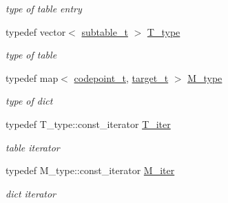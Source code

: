 \begin{DoxyCompactItemize}
\begin{DoxyCompactList}\small\item\em type of table entry \end{DoxyCompactList}\item 
\hypertarget{namespacejlettvin_a7791a7f100e442c5b74a901442cd3197}{}typedef vector$<$ \hyperlink{namespacejlettvin_a7133ba660d288e5f368d7285843739c8}{subtable\+\_\+t} $>$ \hyperlink{namespacejlettvin_a7791a7f100e442c5b74a901442cd3197}{T\+\_\+type}\label{namespacejlettvin_a7791a7f100e442c5b74a901442cd3197}

\begin{DoxyCompactList}\small\item\em type of table \end{DoxyCompactList}\item 
\hypertarget{namespacejlettvin_a37ff8ef881a4ed6efce44bac38621732}{}typedef map$<$ \hyperlink{namespacejlettvin_a5c480560edc7a71c9f5ae6dad14e6fec}{codepoint\+\_\+t}, \hyperlink{namespacejlettvin_ac925326f2732a65f4e3caaea182401a9}{target\+\_\+t} $>$ \hyperlink{namespacejlettvin_a37ff8ef881a4ed6efce44bac38621732}{M\+\_\+type}\label{namespacejlettvin_a37ff8ef881a4ed6efce44bac38621732}

\begin{DoxyCompactList}\small\item\em type of dict \end{DoxyCompactList}\item 
\hypertarget{namespacejlettvin_a717af5c4fa2045ec8271403a711500be}{}typedef T\+\_\+type\+::const\+\_\+iterator \hyperlink{namespacejlettvin_a717af5c4fa2045ec8271403a711500be}{T\+\_\+iter}\label{namespacejlettvin_a717af5c4fa2045ec8271403a711500be}

\begin{DoxyCompactList}\small\item\em table iterator \end{DoxyCompactList}\item 
\hypertarget{namespacejlettvin_adb899a2c00ed7361dbc22a0bc907f88c}{}typedef M\+\_\+type\+::const\+\_\+iterator \hyperlink{namespacejlettvin_adb899a2c00ed7361dbc22a0bc907f88c}{M\+\_\+iter}\label{namespacejlettvin_adb899a2c00ed7361dbc22a0bc907f88c}

\begin{DoxyCompactList}\small\item\em dict iterator \end{DoxyCompactList}\end{DoxyCompactItemize}
